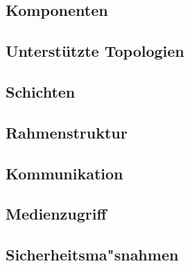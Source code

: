 \subsection{Komponenten}\label{ss:Komponenten}

\subsection{Unterstützte Topologien}\label{ss:UnterstutzeTopologien}

\subsection{Schichten}\label{ss:Schichten}

\subsection{Rahmenstruktur}\label{ss:Rahmenstruktur}

\subsection{Kommunikation}\label{ss:Kommunikation}

\subsection{Medienzugriff}\label{ss:Medienzugriff}

\subsection{Sicherheitsma"snahmen}\label{ss:Sicherheitsmassnahmen}